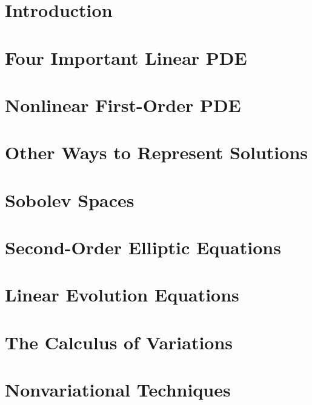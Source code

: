 

\chapter{Introduction}
\label{chap:introduction}


\chapter{Four Important Linear PDE}
\label{chap:four-important-linear-pde}


\chapter{Nonlinear First-Order PDE}
\label{chap:nonlinear-first-order-pde}


\chapter{Other Ways to Represent Solutions}
\label{chap:other-ways-to-represent-solutions}


\chapter{Sobolev Spaces}
\label{chap:sobolev-spaces}


\chapter{Second-Order Elliptic Equations}
\label{chap:second-order-elliptic-equations}


\chapter{Linear Evolution Equations}
\label{chap:linear-evolution-equations}


\chapter{The Calculus of Variations}
\label{chap:the-calculus-of-variations}


\chapter{Nonvariational Techniques}
\label{chap:nonvariational-techniques}


